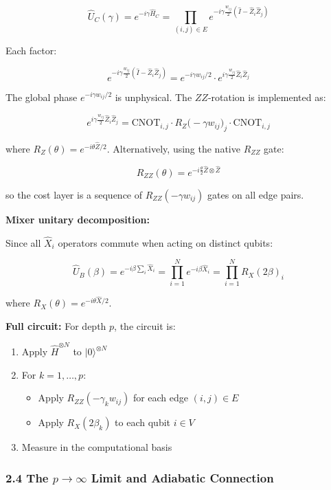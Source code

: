 \documentclass[
  11pt,
]{report}
\providecommand{\tightlist}{%
  \setlength{\itemsep}{0pt}\setlength{\parskip}{0pt}}
\begin{document}
\[\hat{U}_C(\gamma) = e^{-i\gamma \hat{H}_C} = \prod_{(i,j) \in E} e^{-i\gamma \frac{w_{ij}}{2}(\hat{I} - \hat{Z}_i\hat{Z}_j)}\]

Each factor:

\[e^{-i\gamma \frac{w_{ij}}{2}(\hat{I} - \hat{Z}_i\hat{Z}_j)} = e^{-i\gamma w_{ij}/2} \cdot e^{i\gamma \frac{w_{ij}}{2} \hat{Z}_i\hat{Z}_j}\]

The global phase \(e^{-i\gamma w_{ij}/2}\) is unphysical. The
\(ZZ\)-rotation is implemented as:

\[e^{i\gamma \frac{w_{ij}}{2} \hat{Z}_i \hat{Z}_j} = \text{CNOT}_{i,j} \cdot R_Z\bigl(-\gamma w_{ij}\bigr)_j \cdot \text{CNOT}_{i,j}\]

where \(R_Z(\theta) = e^{-i\theta \hat{Z}/2}\). Alternatively, using the
native \(R_{ZZ}\) gate:

\[R_{ZZ}(\theta) = e^{-i\frac{\theta}{2}\hat{Z}\otimes\hat{Z}}\]

so the cost layer is a sequence of \(R_{ZZ}(-\gamma w_{ij})\) gates on
all edge pairs.

\textbf{Mixer unitary decomposition:}

Since all \(\hat{X}_i\) operators commute when acting on distinct
qubits:

\[\hat{U}_B(\beta) = e^{-i\beta \sum_i \hat{X}_i} = \prod_{i=1}^{N} e^{-i\beta \hat{X}_i} = \prod_{i=1}^{N} R_X(2\beta)_i\]

where \(R_X(\theta) = e^{-i\theta \hat{X}/2}\).

\textbf{Full circuit:} For depth \(p\), the circuit is:

\begin{enumerate}
\def\labelenumi{\arabic{enumi}.}
\tightlist
\item
  Apply \(\hat{H}^{\otimes N}\) to \(|0\rangle^{\otimes N}\)
\item
  For \(k = 1, \ldots, p\):

  \begin{itemize}
  \tightlist
  \item
    Apply \(R_{ZZ}(-\gamma_k w_{ij})\) for each edge \((i,j) \in E\)
  \item
    Apply \(R_X(2\beta_k)\) to each qubit \(i \in V\)
  \end{itemize}
\item
  Measure in the computational basis
\end{enumerate}

\subsubsection{\texorpdfstring{2.4 The \(p \to \infty\) Limit and
Adiabatic
Connection}{2.4 The p \textbackslash to \textbackslash infty Limit and Adiabatic Connection}}\label{the-p-to-infty-limit-and-adiabatic-connection}
\end{document}
